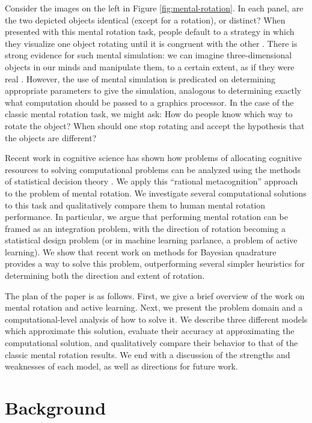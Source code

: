 \documentclass{article} %
\begin{document}
Consider the images on the left in Figure
\ref{fig:mental-rotation}. In each panel, are the two depicted objects
identical (except for a rotation), or distinct? When presented with
this mental rotation task, people default to a strategy in which they
visualize one object rotating until it is congruent with the other
\cite{Shepard1971}. There is strong evidence for such mental
simulation: we can imagine three-dimensional objects in our minds and
manipulate them, to a certain extent, as if they were real
\cite{Kosslyn:2009tj}.  However, the use of mental simulation is
predicated on determining appropriate parameters to give the
simulation, analogous to determining exactly what computation should
be passed to a graphics processor.  In the case of the classic mental
rotation task, we might ask: How do people know which way to rotate
the object?  When should one stop rotating and accept the hypothesis
that the objects are different?

Recent work in cognitive science has shown how problems of allocating
cognitive resources to solving computational problems can be analyzed
using the methods of statistical decision theory
\cite{Lieder:2012wg,Vul:2009wy}. We apply this ``rational
metacognition'' approach to the problem of mental rotation. We
investigate several computational solutions to this task and
qualitatively compare them to human mental rotation performance. In
particular, we argue that performing mental rotation can be framed as
an integration problem, with the direction of rotation becoming a
statistical design problem (or in machine learning parlance, a problem
of active learning). We show that recent work on methods for Bayesian
quadrature \cite{Diaconis:1988uo,OHagan:1991tx,Osborne:2012tm}
provides a way to solve this problem, outperforming several simpler
heuristics for determining both the direction and extent of rotation.

The plan of the paper is as follows. First, we give a brief overview
of the work on mental rotation and active learning. Next, we present
the problem domain and a computational-level analysis of how to solve
it. We describe three different models which approximate this
solution, evaluate their accuracy at approximating the computational
solution, and qualitatively compare their behavior to that of the
classic mental rotation results. We end with a discussion of the
strengths and weaknesses of each model, as well as directions for
future work.


\section{Background}
\end{document}
